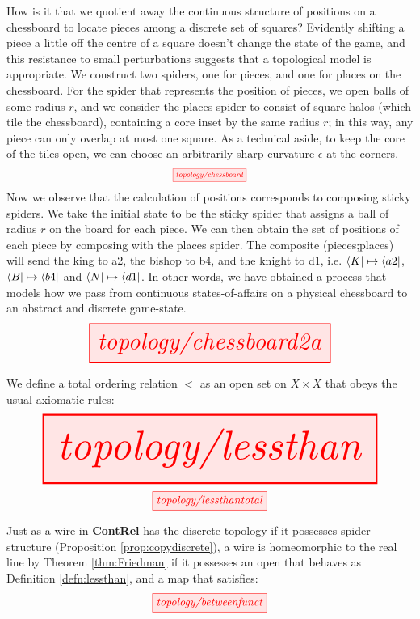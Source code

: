 \begin{myboxB}
\begin{example}\label{ex:chessboard}
How is it that we quotient away the continuous structure of positions on a chessboard to locate pieces among a discrete set of squares? Evidently shifting a piece a little off the centre of a square doesn't change the state of the game, and this resistance to small perturbations suggests that a topological model is appropriate. We construct two spiders, one for pieces, and one for places on the chessboard. For the spider that represents the position of pieces, we open balls of some radius $r$, and we consider the places spider to consist of square halos (which tile the chessboard), containing a core inset by the same radius $r$; in this way, any piece can only overlap at most one square. As a technical aside, to keep the core of the tiles open, we can choose an arbitrarily sharp curvature $\epsilon$ at the corners.
\[\scalebox{0.70}{\tikzfig{topology/chessboard}}\]
Now we observe that the calculation of positions corresponds to composing sticky spiders. We take the initial state to be the sticky spider that assigns a ball of radius $r$ on the board for each piece. We can then obtain the set of positions of each piece by composing with the places spider. The composite (pieces;places)
will send the king to a2, the bishop to b4, and the knight to d1, i.e. $\bra{K} \mapsto \bra{a2}$, $\bra{B} \mapsto \bra{b4}$ and $\bra{N} \mapsto \bra{d1}$. In other words, we have obtained a process that models how we pass from continuous states-of-affairs on a physical chessboard to an abstract and discrete game-state.
\[\resizebox{0.70\textwidth}{!}{\tikzfig{topology/chessboard2a}}\]
\end{example}
\end{myboxB}

\begin{myboxR}
\begin{defn}\label{defn:lessthan}
We define a total ordering relation $<$ as an open set on $X \times X$ that obeys the usual axiomatic rules:
\[\resizebox{\textwidth}{!}{\tikzfig{topology/lessthan}}\]
\[\tikzfig{topology/lessthantotal}\]
\end{defn}
\end{myboxR}

\begin{myboxB}
\begin{defn}
Just as a wire in \textbf{ContRel} has the discrete topology if it possesses spider structure (Proposition \ref{prop:copydiscrete}), a wire is homeomorphic to the real line by Theorem \ref{thm:Friedman} if it possesses an open that behaves as Definition \ref{defn:lessthan}, and a map that satisfies:
\[\tikzfig{topology/betweenfunct}\]
\end{defn}
\end{myboxB}

